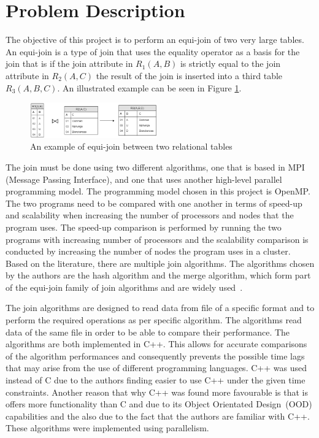 \documentclass[journal,draftclsnofoot]{IEEEtran}
\begin{document}
\section{Problem Description}\label{prob}
The objective of this project is to perform an equi-join of two very large tables. An equi-join is a type of join that uses the equality operator as a basis for the join \cite{w3resource.com2018} that is if the join attribute in $R_{1}(A,B)$ is strictly equal to the join attribute in $R_{2}(A,C)$ the result of the join is inserted into a third table $R_{3}(A, B, C)$. An illustrated example can be seen in Figure \ref{fig:Equi-Join}.
\begin{figure}[htbp]
	\centering
		\includegraphics[width=0.4882\textwidth]{Equi-Join.png}
	\caption{An example of equi-join between two relational tables}
	\label{fig:Equi-Join}
\end{figure}
The join must be done using two different algorithms, one that is based in MPI (Message Passing Interface), and one that uses another high-level parallel programming model. The programming model chosen in this project is OpenMP. The two programs need to be compared with one another in terms of speed-up and scalability when increasing the number of processors and nodes that the program uses. The speed-up comparison is performed by running the two programs with increasing number of processors and the scalability comparison is conducted by increasing the number of nodes the program uses in a cluster. Based on the literature, there are multiple join algorithms. The algorithms chosen by the authors are the hash algorithm and the merge algorithm, which form part of the equi-join family of join algorithms and are widely used~\cite{Wolf1993}.

The join algorithms are designed to read data from  file of a specific format and to perform the required operations as per specific algorithm. The algorithms read data of the same file in order to be able to compare their performance. The algorithms are both implemented in C++. This allows for accurate comparisons of the algorithm performances and consequently prevents the possible time lags that may arise from the use of different programming languages. C++ was used instead of C due to the authors finding easier to use C++ under the given time constraints. Another reason that why C++ was found more favourable is that is offers more functionality than C and due to its Object Orientated Design~(OOD) capabilities and the also due to the fact that the authors are familiar with C++. These algorithms were implemented using parallelism.
\end{document}
